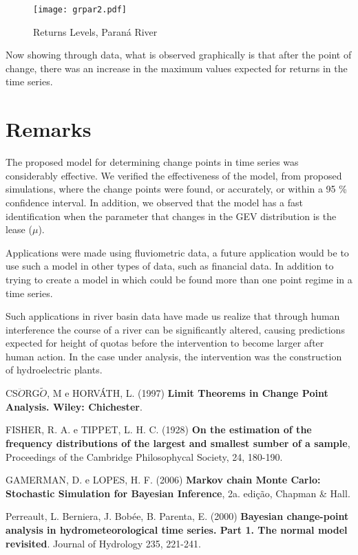 \documentclass{asaproc}
\begin{document}
\begin{figure}[H]
\centering
\texttt{[image: grpar2.pdf]}   
\caption{Returns Levels, Paran\'a River}
\label{r2}
\end{figure}

Now showing through data, what is observed graphically is that after the point of change, there was an increase in the maximum values expected for returns in the time series.

\section{Remarks}

The proposed model for determining change points in time series was considerably effective. We verified the effectiveness of the model, from proposed simulations, where the change points were found, or accurately, or within a 95 \% confidence interval. In addition, we observed that the model has a fast identification when the parameter that changes in the GEV distribution is the lease ($\mu$).

Applications were made using fluviometric data, a future application would be to use such a model in other types of data, such as financial data. In addition to trying to create a model in which could be found more than one point regime in a time series.

Such applications in river basin data have made us realize that through human interference the course of a river can be significantly altered, causing predictions expected for height of quotas before the intervention to become larger after human action. In the case under analysis, the intervention was the construction of hydroelectric plants.

\begin{references}
{\footnotesize
\itemsep=3pt

\item CS$\ddot{O}$RG$\tilde{O}$, M e HORVÁTH, L. (1997) \textbf{Limit Theorems in Change Point Analysis. Wiley: Chichester}.

\item FISHER, R. A. e TIPPET, L. H. C. (1928) {\bf On the estimation of the frequency
distributions of the largest and smallest sumber of a sample}, Proceedings of the
Cambridge Philosophycal Society, 24, 180-190.

\item GAMERMAN, D. e LOPES, H. F. (2006) {\bf Markov chain Monte Carlo: Stochastic Simulation for Bayesian Inference}, 2a. edição, Chapman \& Hall.

\item Perreault, L. Berniera, J. Bobée, B. Parenta, E. (2000) {\bf Bayesian change-point analysis in hydrometeorological time series. Part 1. The normal model revisited}. Journal of Hydrology 235, 221-241.
}
\end{references}
\end{document}
